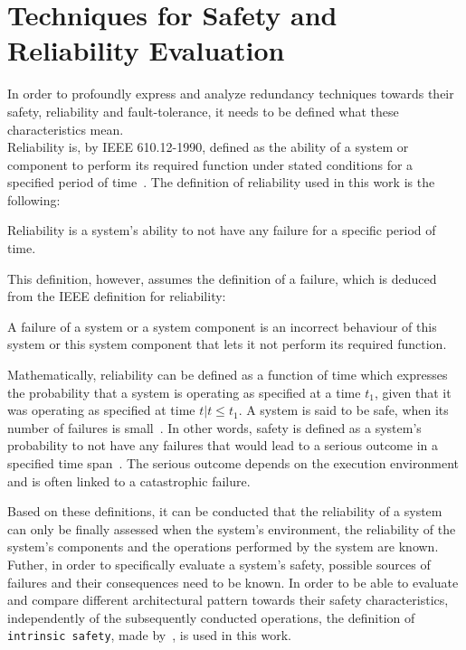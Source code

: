 \section{Techniques for Safety and Reliability Evaluation}
\label{sec:techniquesSafetyReliability}
In order to profoundly express and analyze redundancy techniques towards their safety, reliability and fault-tolerance, it needs to be defined what these characteristics mean.
\\

Reliability is, by IEEE 610.12-1990, defined as the ability of a system or component to perform its required function under stated conditions for a specified period of time~\cite{ieee610.12}.
The definition of reliability used in this work is the following:

\begin{definition}
Reliability is a system's ability to not have any failure for a specific period of time.
\end{definition}

This definition, however, assumes the definition of a failure, which is deduced from the IEEE definition for reliability:

\begin{definition}
A failure of a system or a system component is an incorrect behaviour of this system or this system component that lets it not perform its required function.
\end{definition}

Mathematically, reliability can be defined as a function of time which expresses the probability that a system is operating as specified at a time $t_1$, given that it was operating as specified at time $t | t \leq t_1$.
A system is said to be safe, when its number of failures is small~\cite{HollnagelSafety}.
In other words, safety is defined as a system's probability to not have any failures that would lead to a serious outcome in a specified time span~\cite{GeffroyMotetDependableComputing}.
The serious outcome depends on the execution environment and is often linked to a catastrophic failure.

Based on these definitions, it can be conducted that the reliability of a system can only be finally assessed when the system's environment, the reliability of the system's components and the operations performed by the system are known.
Futher, in order to specifically evaluate a system's safety, possible sources of failures and their consequences need to be known.
In order to be able to evaluate and compare different architectural pattern towards their safety characteristics, independently of the subsequently conducted operations, the definition of \texttt{intrinsic safety}, made by~\cite{BoulangerStandards}, is used in this work.

